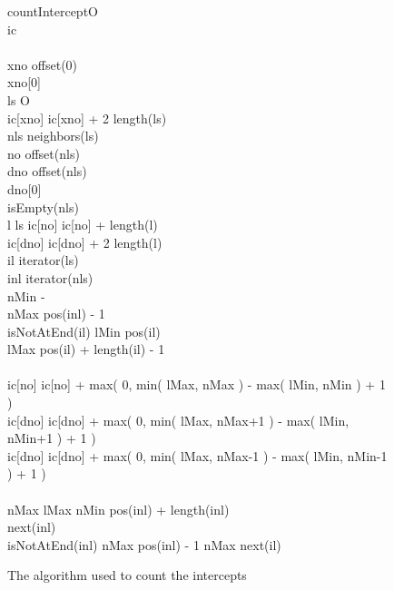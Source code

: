 \documentclass{InsightArticle}
\begin{document}
\begin{figure}[htbp]
\centering
\small
\begin{pseudocode}[framebox]{countIntercept}{O}
 \\
ic \GETS \emptyset \\
 \\
xno \GETS offset(0) \\
xno[0]  \\
\FOREACH ls \in O \DO
\BEGIN
   \\
  ic[xno] \GETS ic[xno] + 2 \cdot length(ls) \\
  \FOREACH nls \in neighbors(ls) \DO
  \BEGIN
     \\
    no \GETS offset(nls) \\
    dno \GETS offset(nls) \\
    dno[0]  \\
    \IF isEmpty(nls) \THEN
    \BEGIN
       \\
      \FOREACH l \in ls \DO
      \BEGIN
	ic[no] \GETS ic[no] + length(l)\\
	ic[dno] \GETS ic[dno] + 2 \cdot length(l)
      \END
    \END
    \ELSE
    \BEGIN
       \\
      il \GETS iterator(ls) \\
      inl \GETS iterator(nls) \\
      nMin \GETS -\infty \\
      nMax \GETS pos(inl) - 1 \\
      \WHILE isNotAtEnd(il) \DO
      \BEGIN
        lMin \GETS pos(il) \\
        lMax \GETS pos(il) + length(il) - 1 \\
         \\
	ic[no] \GETS ic[no] + max( 0, min( lMax, nMax ) - max( lMin, nMin ) + 1 ) \\
	ic[dno] \GETS ic[dno] + max( 0, min( lMax, nMax+1 ) - max( lMin, nMin+1 ) + 1 )\\
	ic[dno] \GETS ic[dno] + max( 0, min( lMax, nMax-1 ) - max( lMin, nMin-1 ) + 1 )\\
         \\
	\IF nMax \leq lMax \THEN
	\BEGIN
          nMin \GETS pos(inl) + length(inl) \\
          next(inl) \\
          \IF isNotAtEnd(inl) \DO
            nMax \GETS pos(inl) - 1
          \ELSE
            nMax \GETS \infty
	\END
	\ELSE
          next(il)
      \END
    \END
  \END
\END
\end{pseudocode}
\caption{\label{interceptCountAlgo}The algorithm used to count the intercepts}
\end{figure}
\end{document}
